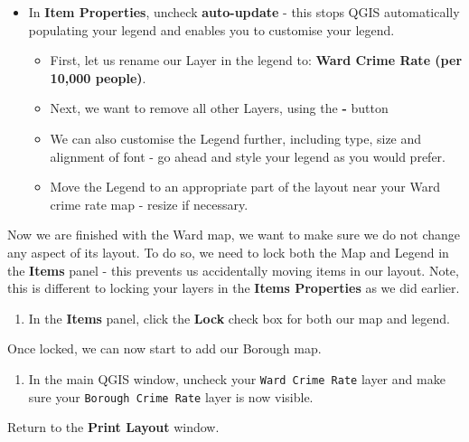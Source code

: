 \documentclass[
]{book}
\providecommand{\tightlist}{%
  \setlength{\itemsep}{0pt}\setlength{\parskip}{0pt}}
\begin{document}
\begin{itemize}
\tightlist
\item
  In \textbf{Item Properties}, uncheck \textbf{auto-update} - this stops QGIS automatically populating your legend and enables you to customise your legend.

  \begin{itemize}
  \tightlist
  \item
    First, let us rename our Layer in the legend to: \textbf{Ward Crime Rate (per 10,000 people)}.
  \item
    Next, we want to remove all other Layers, using the \textbf{-} button
  \item
    We can also customise the Legend further, including type, size and alignment of font - go ahead and style your legend as you would prefer.
  \item
    Move the Legend to an appropriate part of the layout near your Ward crime rate map - resize if necessary.
  \end{itemize}
\end{itemize}

Now we are finished with the Ward map, we want to make sure we do not change any aspect of its layout. To do so, we need to lock both the Map and Legend in the \textbf{Items} panel - this prevents us accidentally moving items in our layout. Note, this is different to locking your layers in the \textbf{Items Properties} as we did earlier.

\begin{enumerate}
\def\labelenumi{\arabic{enumi}.}
\setcounter{enumi}{3}
\tightlist
\item
  In the \textbf{Items} panel, click the \textbf{Lock} check box for both our map and legend.
\end{enumerate}

Once locked, we can now start to add our Borough map.

\begin{enumerate}
\def\labelenumi{\arabic{enumi}.}
\setcounter{enumi}{4}
\tightlist
\item
  In the main QGIS window, uncheck your \texttt{Ward\ Crime\ Rate} layer and make sure your \texttt{Borough\ Crime\ Rate} layer is now visible.
\end{enumerate}

Return to the \textbf{Print Layout} window.
\end{document}

